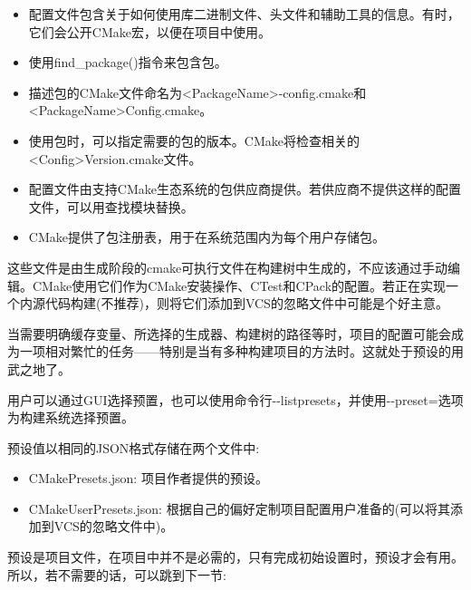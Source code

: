 \begin{itemize}
\item 
配置文件包含关于如何使用库二进制文件、头文件和辅助工具的信息。有时，它们会公开CMake宏，以便在项目中使用。

\item 
使用find\_package()指令来包含包。

\item 
描述包的CMake文件命名为<PackageName>-config.cmake和<PackageName>Config.cmake。

\item 
使用包时，可以指定需要的包的版本。CMake将检查相关的<Config>Version.cmake文件。

\item 
配置文件由支持CMake生态系统的包供应商提供。若供应商不提供这样的配置文件，可以用查找模块替换。

\item 
CMake提供了包注册表，用于在系统范围内为每个用户存储包。
\end{itemize}


这些文件是由生成阶段的cmake可执行文件在构建树中生成的，不应该通过手动编辑。CMake使用它们作为CMake安装操作、CTest和CPack的配置。若正在实现一个内源代码构建(不推荐)，则将它们添加到VCS的忽略文件中可能是个好主意。


当需要明确缓存变量、所选择的生成器、构建树的路径等时，项目的配置可能会成为一项相对繁忙的任务——特别是当有多种构建项目的方法时。这就处于预设的用武之地了。

用户可以通过GUI选择预置，也可以使用命令行-{}-listpresets，并使用-{}-preset=选项为构建系统选择预置。

预设值以相同的JSON格式存储在两个文件中:

\begin{itemize}
\item 
CMakePresets.json: 项目作者提供的预设。

\item 
CMakeUserPresets.json: 根据自己的偏好定制项目配置用户准备的(可以将其添加到VCS的忽略文件中)。
\end{itemize}

预设是项目文件，在项目中并不是必需的，只有完成初始设置时，预设才会有用。所以，若不需要的话，可以跳到下一节:

